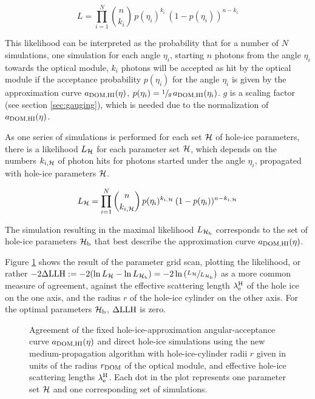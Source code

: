 \begin{equation}
  L = \prod_{i=1}^N \binom{n}{k_i}\,p(\eta_i)^{k_i}\,(1-p(\eta_i))^{n-k_i}
\end{equation}

This likelihood can be interpreted as the probability that for a number
of \(N\) simulations, one simulation for each angle \(\eta_i\), starting
\(n\) photons from the angle \(\eta_i\) towards the optical module,
\(k_i\) photons will be accepted as hit by the optical module if the
acceptance probability \(p(\eta_i)\) for the angle \(\eta_i\) is given
by the approximation curve \(a_\text{DOM,HI}(\eta)\),
\(p(\eta_i) = \sfrac{1}{g}\,a_\text{DOM,HI}(\eta_i)\). \(g\) is a scaling factor
(see section \ref{sec:gauging}), which is needed due to the
normalization of \(a_\text{DOM,HI}(\eta)\).

As one series of simulations is performed for each set \(\mathcal{H}\) of
hole-ice parameters, there is a likelihood \(L_{\mathcal{H}}\) for each parameter
set \(\mathcal{H}\), which depends on the numbers \(k_{i,\mathcal{H}}\) of photon hits
for photons started under the angle \(\eta_i\), propagated with hole-ice
parameters \(\mathcal{H}\).

\[
  L_{\mathcal{H}} = \prod_{i=1}^N \binom{n}{k_{i,\mathcal{H}}}\,p(\eta_i)^{k_{i,\mathcal{H}}}\,(1-p(\eta_i))^{n-k_{i,\mathcal{H}}}
\]

The simulation resulting in the maximal likelihood \(L_{\mathcal{H}_\text{b}}\)
corresponds to the set of hole-ice parameters \({\mathcal{H}_\text{b}}\) that best
describe the approximation curve \(a_\text{DOM,HI}(\eta)\).

Figure \ref{fig:AWa5aiCh} shows the result of the parameter grid scan,
plotting the likelihood, or rather
\(-2\Delta\text{LLH}:= -2(\ln L_{\mathcal{H}} - \ln L_{\mathcal{H}_\text{b}}) = -2 \ln \left(\sfrac{L_{\mathcal{H}}}{L_{\mathcal{H}_\text{b}}}\right)\)
as a more common measure of agreement, against the effective scattering
length \(\lambda_\text{e}^\text{H}\) of the hole ice on the one axis, and the
radius \(r\) of the hole-ice cylinder on the other axis. For the optimal
parameters \({\mathcal{H}_\text{b}}\), \(\Delta\text{LLH}\) is zero.

\begin{figure}[htbp]
  \caption{Agreement of the fixed hole-ice-approximation angular-acceptance curve $a_\text{DOM,HI}(\eta)$ and direct hole-ice simulations using the new \clsim medium-propagation algorithm with hole-ice-cylinder radii $r$ given in units of the radius $r_\text{DOM}$ of the optical module, and effective hole-ice scattering lengths $\lambda_\text{e}^\text{H}$. Each dot in the plot represents one parameter set $\mathcal{H}$ and one corresponding set of simulations.}
  \label{fig:AWa5aiCh}
\end{figure}

